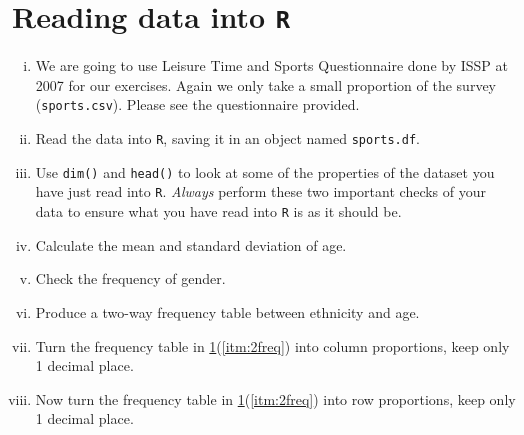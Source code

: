 \documentclass[12pt,a4paper]{article}
\begin{document}
\section{Reading data into \texttt{R}}
\label{sec:read}

\begin{enumerate}[(i)]

\item We are going to use Leisure Time and Sports Questionnaire done
  by ISSP at 2007 for our exercises. Again we only take a small
  proportion of the survey (\texttt{sports.csv}). Please see the
  questionnaire provided. 
\item Read the data into \texttt{R}, saving it in an object named
  \texttt{sports.df}. 
\item Use \texttt{dim()} and \texttt{head()} to look at some of the
  properties of the dataset you have just read into
  \texttt{R}. \emph{Always} perform these two important checks of your
  data to ensure what you have read into \texttt{R} is as it should
  be. 
\item Calculate the mean and standard deviation of age.
\item Check the frequency of gender.
\item \label{itm:2freq} Produce a two-way frequency table between
  ethnicity and age. 
\item Turn the frequency table in \ref{sec:read}(\ref{itm:2freq})
into column proportions, keep only 1 decimal place.
\item Now turn the frequency table in \ref{sec:read}(\ref{itm:2freq})
  into row proportions, keep only 1 decimal place.
\end{enumerate}
\end{document}
